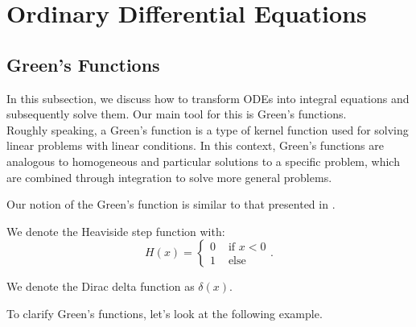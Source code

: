 \documentclass[a4paper,12pt]{article}
\begin{document}
\section{Ordinary Differential Equations}

\subsection{Green's Functions}
In this subsection, we discuss how to transform ODEs into integral equations and
subsequently solve them. Our main tool for this is Green's functions. \\

Roughly speaking, a Green's function is a type of kernel function used
for solving linear problems with linear conditions. In this context,
Green's functions are analogous to homogeneous and particular solutions
to a specific problem, which are combined through integration to solve
more general problems.

\begin{related}
    Our notion of the Green's function is similar to that presented
    in \cite{hwang_simulationtabulation_2001}.
\end{related}


\begin{notation}[$H$]
    We denote the Heaviside step function with:
    \begin{equation}
        H(x) = \begin{cases}
            0 & \text{ if } x<0 \\
            1 & \text{ else }
        \end{cases}.
    \end{equation}
\end{notation}

\begin{notation}[$\delta$]
    We denote the Dirac delta function as $\delta(x)$.
\end{notation}


To clarify Green's functions, let's look at the following example.
\end{document}
